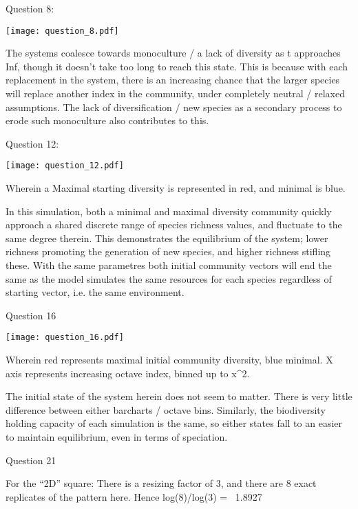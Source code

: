 \documentclass[11pt, a4paper]{article}
\begin{document}
Question 8:
 
\vspace{2cm} 
 
\texttt{[image: question\_8.pdf]}
 
 
The systems coalesce towards monoculture / a lack of diversity as t approaches Inf, though it doesn't take too long to reach this state. This is because with each replacement in the system, there is an increasing chance that the larger species will replace another index in the community, under completely neutral / relaxed assumptions. The lack of diversification / new species as a secondary process to erode such monoculture also contributes to this.

\pagebreak

Question 12:

\vspace{2cm}


\texttt{[image: question\_12.pdf]} 

Wherein a Maximal starting diversity is represented in red, and minimal is blue.


In this simulation, both a minimal and maximal diversity community quickly approach a shared discrete range of species richness values, and fluctuate to the same degree therein. This demonstrates the equilibrium of the system; lower richness promoting the generation of new species, and higher richness stifling these. With the same parametres both initial community vectors will end the same as the model simulates the same resources for each species regardless of starting vector, i.e. the same environment.

\newpage

Question 16

\texttt{[image: question\_16.pdf]}

Wherein red represents maximal initial community diversity, blue minimal. X axis represents increasing octave index, binned up to x^2.

The initial state of the system herein does not seem to matter. There is very little difference between either barcharts / octave bins. Similarly, the biodiversity holding capacity of each simulation is the same, so either states fall to an easier to maintain equilibrium, even in terms of speciation.


\newpage

Question 21


For the “2D” square: There is a resizing factor of 3, and there are 8 exact replicates of the pattern here. Hence log(8)/log(3) =~ 1.8927
\end{document}
